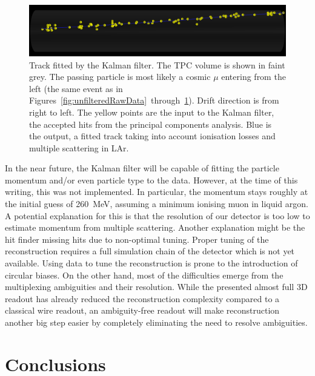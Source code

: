 \documentclass[a4paper]{article}
\begin{document}
\begin{figure}[htb]
	\centering
	\includegraphics[width=\textwidth]{event967_kalman}
	\caption{Track fitted by the Kalman filter.
		The TPC volume is shown in faint grey.
		The passing particle is most likely a cosmic $\mu$ entering from the left (the same event as in Figures~\ref{fig:unfilteredRawData}~through~\ref{fig:kalman}).
		Drift direction is from right to left.
		The yellow points are the input to the Kalman filter, the accepted hits from the principal components analysis.
		Blue is the output, a fitted track taking into account ionisation losses and multiple scattering in LAr.}
	\label{fig:kalman}
\end{figure}

\afterpage{\clearpage}

In the near future, the Kalman filter will be capable of fitting the particle momentum and/or even particle type to the data.
However, at the time of this writing, this was not implemented.
In particular, the momentum stays roughly at the initial guess of \SI{260}{\mega\electronvolt}, assuming a minimum ionising muon in liquid argon.
A potential explanation for this is that the resolution of our detector is too low to estimate momentum from multiple scattering.
Another explanation might be the hit finder missing hits due to non-optimal tuning.
Proper tuning of the reconstruction requires a full simulation chain of the detector which is not yet available.
Using data to tune the reconstruction is prone to the introduction of circular biases.
On the other hand, most of the difficulties emerge from the multiplexing ambiguities and their resolution.
While the presented almost full 3D readout has already reduced the reconstruction complexity compared to a classical wire readout, an ambiguity-free readout will make reconstruction another big step easier by completely eliminating the need to resolve ambiguities.

\clearpage

\section{Conclusions} \label{sec:Summary}
\end{document}
